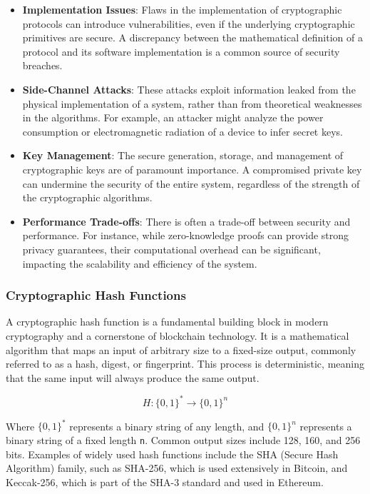 \begin{itemize}
	\tightlist
	\item
	\textbf{Implementation Issues}: Flaws in the implementation of
	cryptographic protocols can introduce vulnerabilities, even if the
	underlying cryptographic primitives are secure. A discrepancy between
	the mathematical definition of a protocol and its software
	implementation is a common source of security breaches.
	\item
	\textbf{Side-Channel Attacks}: These attacks exploit information
	leaked from the physical implementation of a system, rather than from
	theoretical weaknesses in the algorithms. For example, an attacker
	might analyze the power consumption or electromagnetic radiation of a
	device to infer secret keys.
	\item
	\textbf{Key Management}: The secure generation, storage, and
	management of cryptographic keys are of paramount importance. A
	compromised private key can undermine the security of the entire
	system, regardless of the strength of the cryptographic algorithms.
	\item
	\textbf{Performance Trade-offs}: There is often a trade-off between
	security and performance. For instance, while zero-knowledge proofs
	can provide strong privacy guarantees, their computational overhead
	can be significant, impacting the scalability and efficiency of the
	system.
\end{itemize}

\subsubsection{Cryptographic Hash
	Functions}\label{cryptographic-hash-functions}

A cryptographic hash function is a fundamental building block in modern
cryptography and a cornerstone of blockchain technology. It is a
mathematical algorithm that maps an input of arbitrary size to a
fixed-size output, commonly referred to as a hash, digest, or
fingerprint. This process is deterministic, meaning that the same input
will always produce the same output.

\begin{equation}
	H: \{0,1\}^* \rightarrow \{0,1\}^n
\end{equation}


Where $\{0,1\}^*$ represents a binary string of any length, and
$\{0,1\}^n$ represents a binary string of a fixed length
\texttt{n}. Common output sizes include 128, 160, and 256 bits. Examples
of widely used hash functions include the SHA (Secure Hash Algorithm)
family, such as SHA-256, which is used extensively in Bitcoin, and
Keccak-256, which is part of the SHA-3 standard and used in Ethereum.

